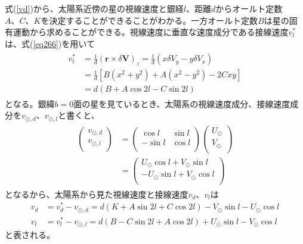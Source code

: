 式(\ref{vd})から、太陽系近傍の星の視線速度と銀経$l$、距離$d$からオールト定数$A、C、K$を決定することができることがわかる。一方オールト定数$B$は星の固有運動から求めることができる。視線速度に垂直な速度成分である接線速度$v^*_l$は、式(\ref{eq266})を用いて
\begin{align}
\begin{aligned}
	v^*_l &= \frac{1}{d}(\pmb{r} \times \delta\pmb{V})_z = \frac{1}{d}(x\delta V_y - y\delta V_x)\\
	&= \frac{1}{d}[B(x^2 + y^2) + A(x^2 - y^2) - 2Cxy] \\
	&= d(B + A\cos2l - C \sin2l)
\end{aligned}
\end{align}
となる。銀緯$b=0$面の星を見ているとき、太陽系の視線速度成分、接線速度成分を$v_{\odot,d}、v_{\odot,l}$と書くと、
\begin{align}
\begin{aligned}
	\left(
	\begin{array}{c}
	 	v_{\odot,d}\\
		v_{\odot,l}\\
	\end{array}
	\right)
	&=
	\left(
	\begin{array}{cc}
	 	\cos l & \sin l\\
		-\sin l & \cos l\\
	\end{array}
	\right)
	\left(
	\begin{array}{c}
	 	U_{\odot}\\
		V_{\odot}\\
	\end{array}
	\right) \\
	&=
	\left(
	\begin{array}{c}
	 	U_{\odot} \cos l + V_{\odot} \sin l\\
		-U_{\odot} \sin l + V_{\odot} \cos l\\
	\end{array}
	\right)
\end{aligned}
\end{align}
となるから、太陽系から見た視線速度と接線速度$v_d、v_l$は
\begin{subequations}
\begin{align}
    v_d &= v^*_d - v_{\odot,d} =  d(K+A\sin{2l}+C\cos{2l}) -V_{\odot}\sin{l} - U_{\odot}\cos{l} \label{eq:6} \\
    v_l &= v^*_l - v_{\odot,l} = d(B-C\sin{2l}+A\cos{2l}) + U_{\odot}\sin{l} - V_{\odot}\cos{l} \label{eq:7}
\end{align}
\end{subequations}
と表される。


